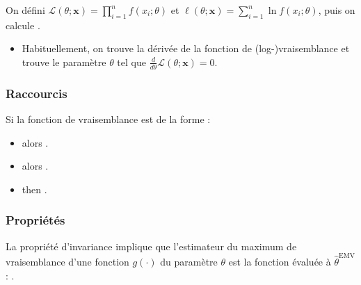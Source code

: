 \documentclass[10pt, french]{article}
\begin{document}
\begin{multicols*}{2}
\begin{definitionNOHFILL}
On défini $\mathcal{L}(\theta; \bm{x}) = \prod_{i = 1}^{n}	f(x_{i}; \theta)$ et $\ell(\theta; \bm{x}) = \sum_{i = 1}^{n} \ln	f(x_{i}; \theta)$, puis on calcule .

\begin{itemize}
	\item	Habituellement, on trouve la dérivée de la fonction de (log-)vraisemblance et trouve le paramètre $\theta$ tel que $\frac{d}{d\theta}\mathcal{L}(\theta; \bm{x}) = 0$.
\end{itemize}
\end{definitionNOHFILL}



\subsubsection{Raccourcis}
Si la fonction de vraisemblance est de la forme :
\begin{itemize}
	\item	{} alors .
	\item	{} alors .
	\item	{} then .
\end{itemize}



\subsubsection{Propriétés}
\begin{definitionNOHFILLsub}
La propriété d'invariance implique que l'estimateur du maximum de vraisemblance d'une fonction $g(\cdot)$ du paramètre $\theta$ est la fonction évaluée à $\hat{\theta}^{\text{EMV}}$ : .

\end{definitionNOHFILLsub}


\end{multicols*}
\end{document}
